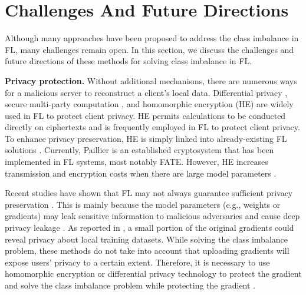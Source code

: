 \documentclass[10pt,journal,compsoc]{IEEEtran}
\begin{document}
	
	\section{Challenges And Future Directions}
	Although many approaches have been proposed to address the class imbalance in FL, many challenges remain open. In this section, we discuss the challenges and future directions of these methods for solving class imbalance in FL.
	
	\textbf{Privacy protection.}
	Without additional mechanisms, there are numerous ways for a malicious server to reconstruct a client's local data. Differential privacy \cite{huang2020dp}, secure multi-party computation \cite{du2004privacy} \cite{mohassel2017secureml}, and homomorphic encryption  (HE)\cite{yuan2013privacy} are widely used in FL to protect client privacy. HE permits calculations to be conducted directly on ciphertexts and is frequently employed in FL to protect client privacy. To enhance privacy preservation, HE is simply linked into already-existing FL solutions \cite{hardy2017private} \cite{liu2020secure} \cite{zhang2020batchcrypt}. Currently, Paillier \cite{paillier1999public} is an established cryptosystem that has been implemented in FL systems, most notably FATE. However, HE increases transmission and encryption costs when there are large model parameters \cite{zhang2020batchcrypt} \cite{zhang2021dubhe}.
	
	Recent studies have shown that FL may not always guarantee sufficient privacy preservation \cite{geiping2020inverting}. This is mainly because the model parameters (e.g., weights or gradients) may leak sensitive information to malicious adversaries and cause deep privacy leakage \cite{bhowmick2018protection} \cite{zhu2019deep}. As reported in \cite{aono2017privacy}, a small portion of the original gradients could reveal privacy about local training datasets. While solving the class imbalance problem, these methods do not take into account that uploading gradients will expose users' privacy to a certain extent. Therefore, it is necessary to use homomorphic encryption or differential privacy technology to protect the gradient and solve the class imbalance problem while protecting the gradient \cite{hahn2019privacy} \cite{yin2021comprehensive} \cite{mothukuri2021survey} \cite{aono2017privacy}.
	
\end{document}

